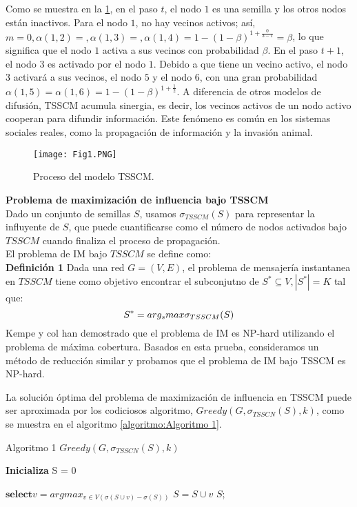 \documentclass{article}
\begin{document}
Como se muestra en la \ref{Fig:01}, en el paso $t$, el nodo $1$ es una semilla y los otros nodos están inactivos. Para el nodo $1$, no hay vecinos activos; así, $m = 0, \alpha(1,2) =, \alpha(1,3) =, \alpha(1,4) = 1 - (1 - \beta)^{1+\frac{0}{3-1}} = \beta$, lo que significa que el nodo $1$ activa a sus vecinos con probabilidad $\beta$. En el paso $t + 1$, el nodo $3$ es activado por el nodo $1$. Debido a que tiene un vecino activo, el nodo 3 activará a sus vecinos, el nodo $5$ y el nodo $6$, con una gran probabilidad $\alpha(1,5) = \alpha(1,6) = 1 - (1 - \beta)^{1+\frac{1}{2}}$. A diferencia de otros modelos de difusión, TSSCM acumula sinergia, es decir, los vecinos activos de un nodo activo cooperan para difundir información. Este fenómeno es común en los sistemas sociales reales, como la propagación de información y la invasión animal.

\begin{figure}[h]
	\centering
	\texttt{[image: Fig1.PNG]}
	\label{Fig:01}
	\caption{Proceso del modelo TSSCM.}
\end{figure}

\textbf{Problema de maximización de influencia bajo TSSCM}\\

Dado un conjunto de semillas $S$, usamos $\sigma_{TSSCM}(S)$ para representar la influyente de $S$, que puede cuantificarse como el número de nodos activados bajo $TSSCM$ cuando finaliza el proceso de propagación. \\
El problema de IM bajo $TSSCM$ se define como: \\

\textbf{Definición 1} Dada una red $G = (V, E)$, el problema de mensajería instantanea en $TSSCM$ tiene como objetivo encontrar el subconjutno de $S^* \subseteq V, |S^*|= K$ tal que: 
\begin{equation}
	\centering
	S^* = arg_smax\sigma_{TSSCM}(S)
\end{equation}
Kempe y col \cite{cite:12} han demostrado que el problema de IM es NP-hard utilizando el problema de máxima cobertura. Basados en esta prueba, consideramos un método de reducción similar y probamos que el problema de IM bajo TSSCM es NP-hard.

La solución óptima del problema de maximización de influencia en TSSCM puede ser aproximada por los codiciosos algoritmo,  $Greedy(G, \sigma_{TSSCN}(S), k)$, como se muestra en el algoritmo \ref{algoritmo:Algoritmo 1}.\\

\begin{algorithm}[h]
	\label{algoritmo:Algoritmo 1}
	\caption{Algoritmo 1 $Greedy(G, \sigma_{TSSCN}(S), k)$}
	\textbf{Inicializa } S = 0\\
	\begin{algorithmic}
	 \STATE $\textbf{select} v = arg max_{v \in V(\sigma(S \cup v) - \sigma(S))}$
	 \STATE $S = S \cup v	$
	 \ENDWHILE
	 \RETURN $S$;
	\end{algorithmic}
\end{algorithm}
\end{document}
